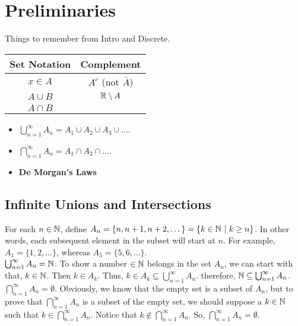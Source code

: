 \section{Preliminaries}

Things to remember from Intro and Discrete.

\begin{table}[htbp]
\begin{tabular}{c||c}
Set Notation & Complement \\
\hline 
$x \in A$ & $A^c$ (not $\overline{A}$) \\
$A \cup B$ & $\mathbb{R} \setminus A$ \\
$A \cap B$
\end{tabular}
\end{table}

\begin{itemize}
\item $\displaystyle \bigcup^\infty_{n=1} A_n = A_1 \cup A_2 \cup A_3 \cup \dots$. \\

\item $\displaystyle \bigcap^\infty_{n=1} A_n = A_1 \cap A_2 \cap \dots$. \\

\item \textbf{\Gls{De Morgan's Laws}} \\
\end{itemize}


\pfs

\subsection{Infinite Unions and Intersections} \hfill

For each $n \in \mathbb{N}$, define $A_n = \{n, n+1, n+2,\dots\} = \{k \in \mathbb{N} \ | \ k \geq n\}$. In other words, each subsequent element in the subset will start at $n$. For example, $A_1 = \{1,2,\dots\}$, whereas $A_5 = \{5,6,\dots\}.$   \\

$\bigcup^\infty_{n=1} A_n = \mathbb{N}$. To show a number $\in \mathbb{N}$ belongs in the set $A_n$, we can start with that, $k \in \mathbb{N}$. Then $k \in A_k$. Thus, $k \in A_k \subseteq \bigcup^\infty_{n=1}A_n$. therefore, $\mathbb{N} \subseteq \bigcup^\infty_{n=1}A_n$. \\

$\bigcap^\infty_{n=1}A_n = \emptyset$. Obviously, we know that the empty set is a subset of $A_n$, but to prove that $\bigcap^\infty_{n=1}A_n$ is a subset of the empty set, we should suppose a $k \in \mathbb{N}$ such that $k \in \bigcap^\infty_{n=1}A_n$. Notice that $k \notin \bigcap^\infty_{n=1}A_n$. So, $\bigcap^\infty_{n=1}A_n = \emptyset$.

